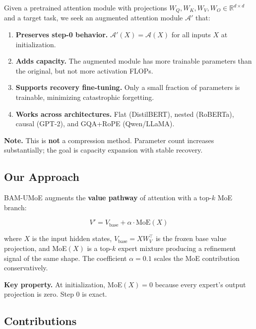 Given a pretrained attention module with projections 
$W_Q, W_K, W_V, W_O \in \mathbb{R}^{d \times d}$ and a target task, we seek 
an augmented attention module $\mathcal{A}'$ that:

\begin{enumerate}
\item \textbf{Preserves step-0 behavior.} $\mathcal{A}'(X) = \mathcal{A}(X)$ for
  all inputs $X$ at initialization.
\item \textbf{Adds capacity.} The augmented module has more trainable parameters
  than the original, but not more activation FLOPs.
\item \textbf{Supports recovery fine-tuning.} Only a small fraction of parameters
  is trainable, minimizing catastrophic forgetting.
\item \textbf{Works across architectures.} Flat (DistilBERT), nested (RoBERTa),
  causal (GPT-2), and GQA+RoPE (Qwen/LLaMA).

\end{enumerate}
\textbf{Note.} This is \textbf{not} a compression method. Parameter count increases 
substantially; the goal is capacity expansion with stable recovery.

\subsection{Our Approach}

BAM-UMoE augments the \textbf{value pathway} of attention with a top-$k$ MoE 
branch:

\[
V' = V_{\text{base}} + \alpha \cdot \text{MoE}(X)
\]

where $X$ is the input hidden states, $V_\text{base} = X W_V^\top$ is the 
frozen base value projection, and MoE$(X)$ is a top-$k$ expert mixture 
producing a refinement signal of the same shape. The coefficient $\alpha = 0.1$ 
scales the MoE contribution conservatively.

\textbf{Key property.} At initialization, MoE$(X) = 0$ because every expert's 
output projection is zero. Step 0 is exact.

\subsection{Contributions}

